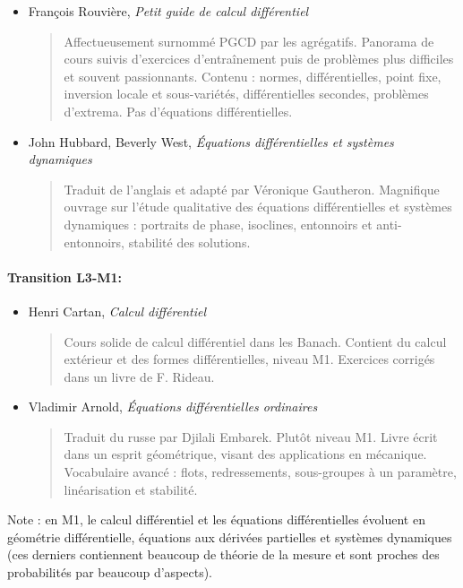 \documentclass{article}
\begin{document}
\begin{mdframed}
\begin{itemize}
\item François Rouvière, \emph{Petit guide de calcul différentiel}
\begin{quote}
Affectueusement surnommé \og PGCD\fg{} par les agrégatifs. Panorama de cours suivis d'exercices d'entraînement puis de problèmes plus difficiles et souvent passionnants.
Contenu : normes, différentielles, point fixe, inversion locale et sous-variétés, différentielles secondes, problèmes d'extrema. Pas d'équations différentielles.
\end{quote}
\end{itemize}
\end{mdframed}
\begin{itemize}
\item John Hubbard, Beverly West, \emph{Équations différentielles et systèmes dynamiques}
\begin{quote}
Traduit de l'anglais et adapté par Véronique Gautheron. Magnifique ouvrage sur l'étude qualitative des équations différentielles et systèmes dynamiques : portraits de phase, isoclines, entonnoirs et anti-entonnoirs, stabilité des solutions.
\end{quote}
\end{itemize}

\paragraph{Transition L3-M1:}
\begin{itemize}
\item Henri Cartan, \emph{Calcul différentiel}
\begin{quote}
Cours solide de calcul différentiel dans les Banach. Contient du calcul extérieur et des formes différentielles, niveau M1. Exercices corrigés dans un livre de F. Rideau.
\end{quote}
\item Vladimir Arnold, \emph{Équations différentielles ordinaires}
\begin{quote}
Traduit du russe par Djilali Embarek. Plutôt niveau M1. Livre écrit dans un esprit géométrique, visant des applications en mécanique. Vocabulaire avancé : flots, redressements, sous-groupes à un paramètre, linéarisation et stabilité.
\end{quote}
\end{itemize}

Note : en M1, le calcul différentiel et les équations différentielles évoluent en géométrie différentielle, équations aux dérivées partielles et systèmes dynamiques (ces derniers contiennent beaucoup de théorie de la mesure et sont proches des probabilités par beaucoup d'aspects).
\end{document}
